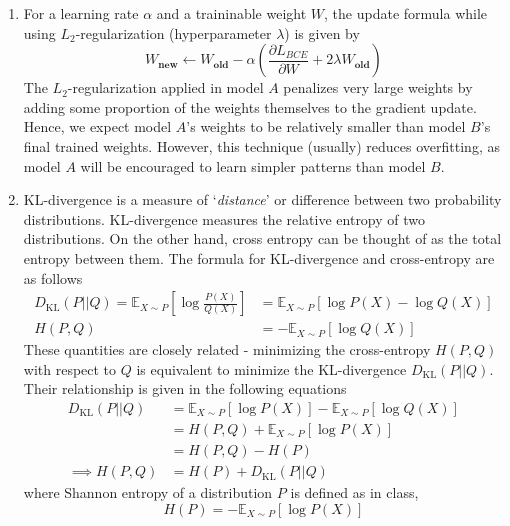 \documentclass[10pt]{article}
\begin{document}
\begin{enumerate}[label=(\alph*)]
        \item For a learning rate $\alpha$ and a traininable weight $W$, the update formula
        while using $L_{2}$-regularization (hyperparameter $\lambda$) is given by
        \begin{equation*}
            W_{\mathbf{new}} \gets W_{\mathbf{old}} - \alpha \left( \frac{\partial{L_{BCE}}}{\partial{W}}
            + 2 \lambda W_{\mathbf{old}} \right)
        \end{equation*}
        The $L_{2}$-regularization applied in model $A$ penalizes very large weights by adding some
        proportion of the weights themselves to the gradient update. Hence, we expect model $A$'s weights
        to be relatively smaller than model $B$'s final trained weights. However, this technique (usually)
        reduces overfitting, as model $A$ will be encouraged to learn simpler patterns than model $B$.

        \item KL-divergence is a measure of `\textit{distance}' or difference between two probability distributions.
        KL-divergence measures the relative entropy of two distributions. On the other hand, cross entropy can
        be thought of as the total entropy between them. The formula for KL-divergence and cross-entropy are as follows
        \begin{align*}
            D_{\text{KL}}(P || Q) = \mathbb{E}_{X \sim P}\left[ \log\frac{P(X)}{Q(X)} \right]
            &= \mathbb{E}_{X \sim P}[\log P(X) - \log Q(X)]\\
            H(P, Q) &= - \mathbb{E}_{X \sim P}[\log Q(X)]
        \end{align*}
        These quantities are closely related - minimizing the cross-entropy $H(P, Q)$ with respect to $Q$
        is equivalent to minimize the KL-divergence $D_{\text{KL}}(P || Q)$. Their relationship is given in
        the following equations
        \begin{align*}
            D_{\text{KL}}(P || Q) &= \mathbb{E}_{X \sim P}[\log P(X)] - \mathbb{E}_{X \sim P}[\log Q(X)] \\
            &= H(P, Q) + \mathbb{E}_{X \sim P}[\log P(X)] \\
            &= H(P, Q) - H(P) \\
            \implies H(P, Q) &= H(P) + D_{\text{KL}}(P || Q)
        \end{align*}
        where Shannon entropy of a distribution $P$ is defined as in class,
        \begin{equation*}
            H(P) = - \mathbb{E}_{X \sim P}[\log P(X)]
        \end{equation*}
    \end{enumerate}
\end{document}
